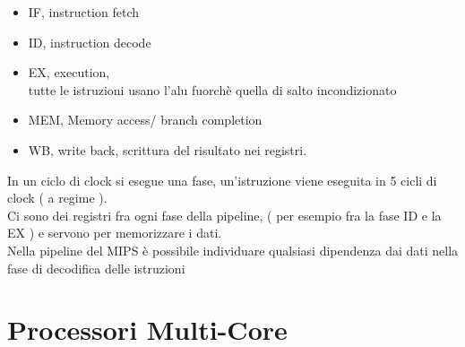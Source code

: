 \documentclass[arch.tex]{subfiles}
\begin{document}
\begin{itemize}
	\item IF, instruction fetch
	\item ID, instruction decode
	\item EX, execution,\\
		tutte le istruzioni usano l'alu fuorchè quella di salto incondizionato
	\item MEM, Memory access/ branch completion
	\item WB, write back, scrittura del risultato nei registri.
\end{itemize}
In un ciclo di clock si esegue una fase, un'istruzione viene eseguita in 5 cicli di clock 
( a regime ).\\
Ci sono dei registri fra ogni fase della pipeline, ( per esempio fra la fase ID e la EX ) e 
servono per memorizzare i dati.\\
Nella pipeline del MIPS è possibile individuare qualsiasi dipendenza dai dati nella fase di 
decodifica delle istruzioni

\section{Processori Multi-Core}%
\label{sec:processori_multi_core}
\end{document}

